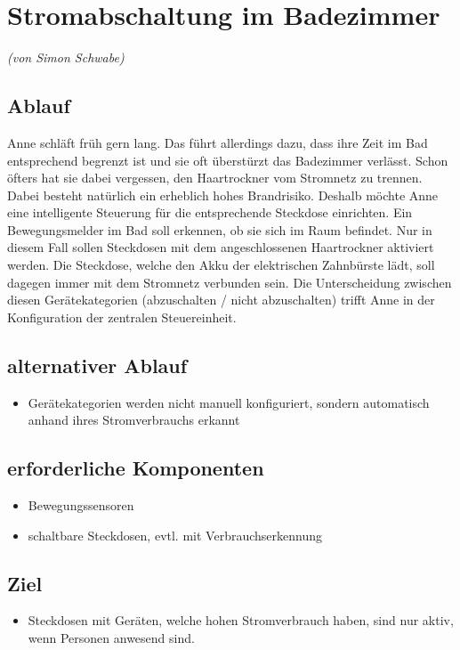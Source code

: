 \section{Stromabschaltung im Badezimmer}
\emph{(von Simon Schwabe)}
\subsection{Ablauf}
Anne schläft früh gern lang. Das führt allerdings dazu, dass ihre Zeit im Bad entsprechend begrenzt ist und sie oft überstürzt das Badezimmer verlässt. Schon öfters hat sie dabei vergessen, den Haartrockner vom Stromnetz zu trennen. Dabei besteht natürlich ein erheblich hohes Brandrisiko.
Deshalb möchte Anne eine intelligente Steuerung für die entsprechende Steckdose einrichten. Ein Bewegungsmelder im Bad soll erkennen, ob sie sich im Raum befindet. Nur in diesem Fall sollen Steckdosen mit dem angeschlossenen Haartrockner aktiviert werden. Die Steckdose, welche den Akku der elektrischen Zahnbürste lädt, soll dagegen immer mit dem Stromnetz verbunden sein.
Die Unterscheidung zwischen diesen Gerätekategorien (abzuschalten / nicht abzuschalten) trifft Anne in der Konfiguration der zentralen Steuereinheit.

\subsection{alternativer Ablauf}
\begin{itemize}
	\item Gerätekategorien werden nicht manuell konfiguriert, sondern automatisch anhand ihres Stromverbrauchs erkannt
\end{itemize}

\subsection{erforderliche Komponenten}
\begin{itemize}
	\item Bewegungssensoren
	\item schaltbare Steckdosen, evtl. mit Verbrauchserkennung
\end{itemize} 

\subsection{Ziel}
\begin{itemize}
	\item Steckdosen mit Geräten, welche hohen Stromverbrauch haben, sind nur aktiv, wenn Personen anwesend sind.
\end{itemize}

